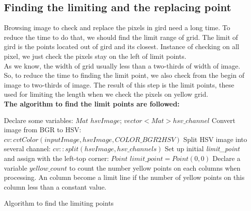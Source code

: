 \subsection{Finding the limiting and the replacing point}
Browsing image to check and replace the pixels in gird need a long time. To reduce the time to do that, we should find the limit range of grid. The limit of gird is the points located out of gird and its closest. Instance of checking on all pixel, we just check the pixels stay on the left of limit points.\\
As we know, the width of grid usually less than a two-thirds of width of image. So, to reduce the time to finding the limit point, we also check from the begin of image to two-thirds of image. The result of this step is the limit points, these used for limiting the length when we check the pixels on yellow grid.\\
\textbf{The algorithm to find the limit points are followed:}\\
\begin{algorithm}[H]
\Indm
{}
\Indp
Declare some variables: $Mat$ $hsvImage$; $vector<Mat> hsv\_channel$\;
Convert image from BGR to HSV: $cv:cvtColor(inputImage, hsvImage, COLOR\_BGR2HSV)$ \;
Split HSV image into several channel: $cv::split(hsvImage, hsv\_channels)$\;
Set up initial \textit{limit\_point} and assign with the left-top corner: $Point$ $limit\_point = Point(0,0)$\;
Declare a variable $yellow\_count$ to count the number yellow points on each columns when processing. An column become a limit line if the number of yellow points on this column less than a constant value.\;
\caption{Algorithm to find the limiting points}
\end{algorithm}~~\\
